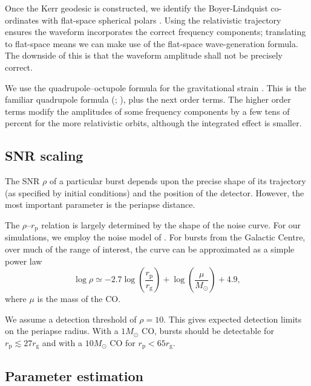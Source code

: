\documentclass[useAMS,usedcolumn,usegraphicx,usenatbib]{mn2e}
\newcommand{\sub}[1]{\ensuremath{_\mathrm{#1}}}
\begin{document}
Once the Kerr geodesic is constructed, we identify the Boyer-Lindquist co-ordinates with flat-space spherical polars \citep{Gair2005, Babak2007}. Using the relativistic trajectory ensures the waveform incorporates the correct frequency components; translating to flat-space means we can make use of the flat-space wave-generation formula. The downside of this is that the waveform amplitude shall not be precisely correct.

We use the quadrupole--octupole formula for the gravitational strain \citep{Bekenstein1973, Press1977, Yunes2008}. This is the familiar quadrupole formula (\citealt*[section 36.10]{Misner1973}; \citealt[section 17.9]{Hobson2006}), plus the next order terms. The higher order terms modify the amplitudes of some frequency components by a few tens of percent for the more relativistic orbits, although the integrated effect is smaller.

\subsection{SNR scaling}\label{sec:SNR}

The SNR $\rho$ of a particular burst depends upon the precise shape of its trajectory (as specified by initial conditions) and the position of the detector. However, the most important parameter is the periapse distance.

The $\rho$--$r\sub{p}$ relation is largely determined by the shape of the noise curve. For our simulations, we employ the noise model of \citet{Barack2004}. For bursts from the Galactic Centre, over much of the range of interest, the curve can be approximated as a simple power law \citep{Berry2013}
\begin{equation}
\log\rho \simeq -2.7\log\left(\frac{r\sub{p}}{r\sub{g}}\right) + \log\left(\frac{\mu}{M_\odot}\right) + 4.9,
\label{eq:SNR-power-law}
\end{equation}
where $\mu$ is the mass of the CO.

We assume a detection threshold of $\rho = 10$. This gives expected detection limits on the periapse radius. With a $1 M_\odot$ CO, bursts should be detectable for $r\sub{p} \lesssim 27 r\sub{g}$ and with a $10 M_\odot$ CO for $r\sub{p} < 65 r\sub{g}$.

\subsection{Parameter estimation}\label{sec:param-est-MCMC}
\end{document}
